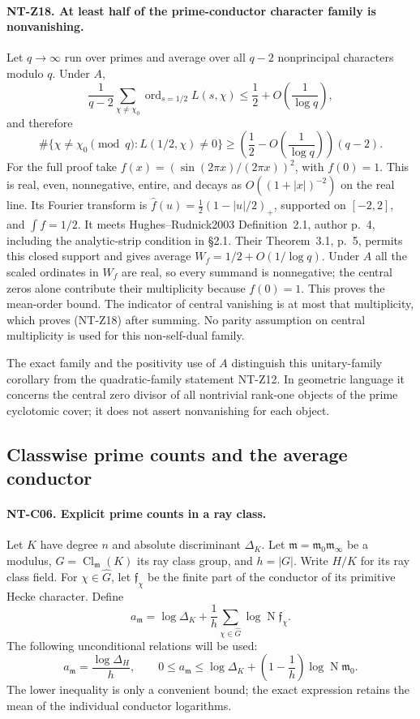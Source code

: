 \paragraph{NT-Z18. At least half of the prime-conductor character family is nonvanishing.}
Let $q\to\infty$ run over primes and average over all $q-2$
nonprincipal characters modulo $q$.  Under $A$,
\[
 \frac1{q-2}\sum_{\chi\ne\chi_0}
             \operatorname{ord}_{s=1/2}L(s,\chi)
       \le\frac12+O\left(\frac1{\log q}\right),
\]
and therefore
\[
 \#\{\chi\ne\chi_0\pmod q:L(1/2,\chi)\ne0\}
       \ge\left(\frac12-O\left(\frac1{\log q}\right)\right)(q-2).
\tag{NT-Z18}
\]
For the full proof take
$f(x)=(\sin(2\pi x)/(2\pi x))^2$, with $f(0)=1$.
This is real, even, nonnegative, entire, and decays as
$O((1+|x|)^{-2})$ on the real line.  Its Fourier transform is
$\widehat f(u)=\tfrac12(1-|u|/2)_+$, supported on $[-2,2]$,
and $\int f=1/2$.  It meets Hughes--Rudnick2003 Definition~2.1,
author p.~4, including the analytic-strip condition in \S2.1.
Their Theorem~3.1, p.~5, permits this closed support and gives
average $W_f=1/2+O(1/\log q)$.
Under $A$ all the scaled ordinates in $W_f$ are real, so every
summand is nonnegative; the central zeros alone contribute their
multiplicity because $f(0)=1$.  This proves the mean-order bound.
The indicator of central vanishing is at most that multiplicity,
which proves (NT-Z18) after summing.  No parity assumption on
central multiplicity is used for this non-self-dual family.

The exact family and the positivity use of $A$ distinguish this
unitary-family corollary from the quadratic-family statement
NT-Z12.  In geometric language it concerns the central zero divisor
of all nontrivial rank-one objects of the prime cyclotomic cover;
it does not assert nonvanishing for each object.

\subsection{Classwise prime counts and the average conductor}

\paragraph{NT-C06. Explicit prime counts in a ray class.}
Let $K$ have degree $n$ and absolute discriminant $\Delta_K$.
Let $\mathfrak m=\mathfrak m_0\mathfrak m_\infty$ be a modulus,
$G=\operatorname{Cl}_{\mathfrak m}(K)$ its ray class group, and
$h=|G|$.  Write $H/K$ for its ray class field.  For
$\chi\in\widehat G$, let $\mathfrak f_\chi$ be the finite part
of the conductor of its primitive Hecke character.  Define
\[
 a_{\mathfrak m}=\log\Delta_K+
           \frac1h\sum_{\chi\in\widehat G}
                    \log\operatorname N\mathfrak f_\chi.
\]
The following unconditional relations will be used:
\[
 a_{\mathfrak m}=\frac{\log\Delta_H}{h},\qquad
 0\le a_{\mathfrak m}\le
 \log\Delta_K+\left(1-\frac1h\right)
                     \log\operatorname N\mathfrak m_0.
\tag{NT-ray-conductor}
\]
The lower inequality is only a convenient bound; the exact expression
retains the mean of the individual conductor logarithms.

